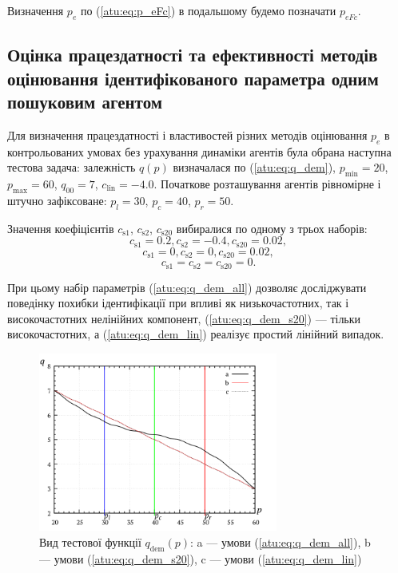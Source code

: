 Визначення $p_e$ по (\ref{atu:eq:p_eFc}) в подальшому будемо позначати $p_{eFc}$.



\subsection{Оцінка працездатності та ефективності методів оцінювання ідентифікованого параметра одним пошуковим агентом} %

Для визначення працездатності і властивостей різних методів оцінювання $p_e$
в контрольованих умовах без урахування динаміки агентів була обрана наступна
тестова задача: залежність $q (p)$ визначалася по (\ref{atu:eq:q_dem}),
$p_{\min}=20$, $p_{\max}=60$,
$q_{00}=7$, $c_\mathrm{lin}=-4.0$.
Початкове розташування агентів рівномірне і штучно зафіксоване:
$p_l=30$, $p_c=40$,  $p_r=50$.

Значення коефіцієнтів
$c_\mathrm{s1}$, $c_\mathrm{s2}$, $c_\mathrm{s20}$
вибиралися по одному з трьох наборів:
%
\begin{equation}
  c_\mathrm{s1} = 0.2, c_\mathrm{s2} = -0.4, c_\mathrm{s20} = 0.02,
  \label{atu:eq:q_dem_all}
\end{equation}
%
\begin{equation}
  c_\mathrm{s1} = 0, c_\mathrm{s2} = 0, c_\mathrm{s20} = 0.02,
  \label{atu:eq:q_dem_s20}
\end{equation}
%
\begin{equation}
  c_\mathrm{s1} = c_\mathrm{s2} = c_\mathrm{s20} = 0 .
  \label{atu:eq:q_dem_lin}
\end{equation}

При цьому набір параметрів (\ref{atu:eq:q_dem_all}) дозволяє досліджувати
поведінку похибки ідентифікації при впливі як низькочастотних,
так і високочастотних нелінійних компонент,
(\ref{atu:eq:q_dem_s20}) ---
тільки високочастотних,
а (\ref{atu:eq:q_dem_lin})
реалізує простий лінійний випадок.

\begin{figure}[htb!]
  \begin{center}
    \includegraphics[width=0.7\textwidth]{p/q_p_dem.png}
  \end{center}
  \caption{Вид тестової функції $q_\mathrm{dem}(p)$:
     a --- умови (\ref{atu:eq:q_dem_all}),
     b --- умови (\ref{atu:eq:q_dem_s20}),
     c --- умови (\ref{atu:eq:q_dem_lin})
  }
  \label{atu:f:q_dem}
\end{figure}

